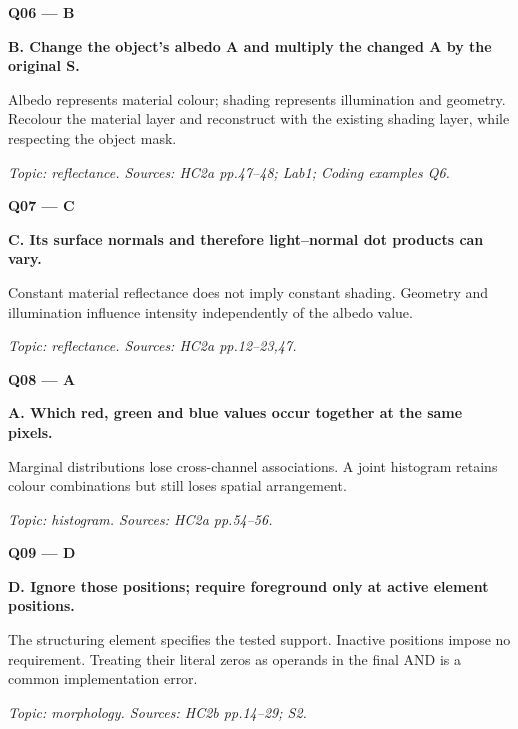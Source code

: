 \documentclass[11pt,a4paper]{article}
\begin{document}
\par\vspace{12pt}
\begin{minipage}{\linewidth}
\textbf{Q06 — B}\par\smallskip
\textbf{B. Change the object's albedo A and multiply the changed A by the original S.}\par
Albedo represents material colour; shading represents illumination and geometry. Recolour the material layer and reconstruct with the existing shading layer,\allowbreak{} while respecting the object mask.\par
{\small\itshape Topic: reflectance. Sources: HC2a pp.47–48; Lab1; Coding examples Q6.}

\end{minipage}
\par\vspace{12pt}
\begin{minipage}{\linewidth}
\textbf{Q07 — C}\par\smallskip
\textbf{C. Its surface normals and therefore light–normal dot products can vary.}\par
Constant material reflectance does not imply constant shading. Geometry and illumination influence intensity independently of the albedo value.\par
{\small\itshape Topic: reflectance. Sources: HC2a pp.12–23,\allowbreak{}47.}

\end{minipage}
\par\vspace{12pt}
\begin{minipage}{\linewidth}
\textbf{Q08 — A}\par\smallskip
\textbf{A. Which red,\allowbreak{} green and blue values occur together at the same pixels.}\par
Marginal distributions lose cross-channel associations. A joint histogram retains colour combinations but still loses spatial arrangement.\par
{\small\itshape Topic: histogram. Sources: HC2a pp.54–56.}

\end{minipage}
\par\vspace{12pt}
\begin{minipage}{\linewidth}
\textbf{Q09 — D}\par\smallskip
\textbf{D. Ignore those positions; require foreground only at active element positions.}\par
The structuring element specifies the tested support. Inactive positions impose no requirement. Treating their literal zeros as operands in the final AND is a common implementation error.\par
{\small\itshape Topic: morphology. Sources: HC2b pp.14–29; S2.}

\end{minipage}
\end{document}
